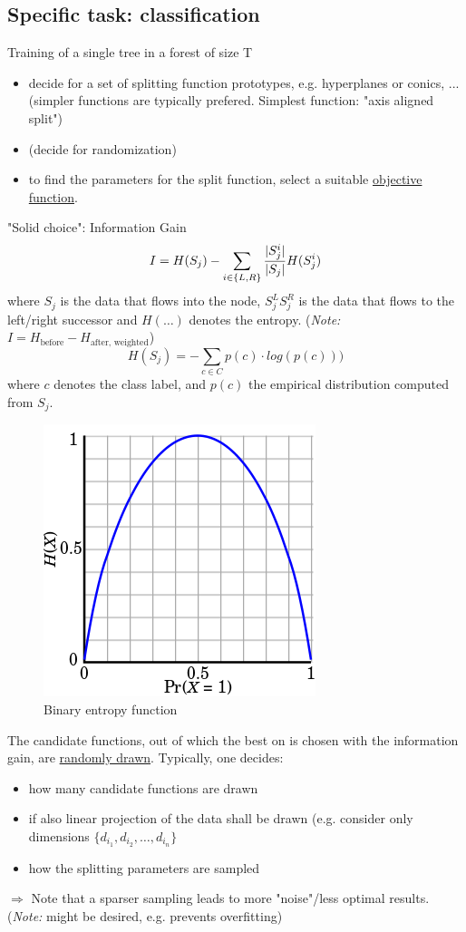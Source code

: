 \documentclass{scrartcl}
\DeclarePairedDelimiter\abs{\lvert}{\rvert}%
\begin{document}
\subsection{Specific task: classification}
Training of a single tree in a forest of size T
\begin{itemize}
    \item
        decide for a set of splitting function prototypes, e.g. hyperplanes or conics, ... (simpler functions are typically prefered. Simplest function: "axis aligned split")
    \item
        (decide for randomization)
    \item
        to find the parameters for the split function, select a suitable \underline{objective function}. 
\end{itemize}
"Solid choice": Information Gain
\[I = H(S_j) - \sum_{i \in \{L,R\}} \frac{\abs{S^i_j}}{\abs{S_j}} H(S^i_j)\]
where \(S_j\) is the data that flows into the node, \(S^L_j S^R_j\) is the data that flows to the left/right successor and \(H(\dots)\) denotes the entropy. (\textit{Note:} \(I = H_{\text{before}} - H_{\text{after, weighted}}\))
\[H(S_j) = -\sum_{c \in C} p(c) \cdot log(p(c)))\] 
where \(c\) denotes the class label, and \(p(c)\) the empirical distribution computed from \(S_j\). 

\begin{figure}[ht]
	\centering
    \includegraphics[scale=0.5]{img/entropy.png}
	\caption{Binary entropy function}
	\label{fig:entropy}
\end{figure}

The candidate functions, out of which the best on is chosen with the information gain, are \underline{randomly drawn}. Typically, one decides:
\begin{itemize}
    \item
        how many candidate functions are drawn
    \item
        if also linear projection of the data shall be drawn (e.g. consider only dimensions \(\{d_{i_1}, d_{i_2}, \dots, d_{i_n}\}\)
    \item
        how the splitting parameters are sampled
\end{itemize}
\(\Rightarrow\) Note that a sparser sampling leads to more "noise"/less optimal results. (\textit{Note:} might be desired, e.g. prevents overfitting)
\end{document}
